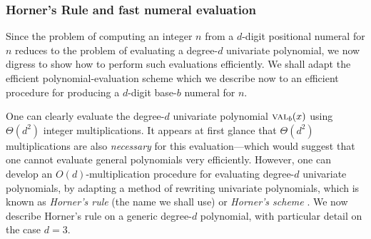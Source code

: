 \subsubsection{Horner's Rule and fast numeral evaluation}
\label{sec:Horner-fast-evaluation}

Since the problem of computing an integer $n$ from a $d$-digit positional numeral for $n$ reduces to the problem of evaluating a degree-$d$ univariate polynomial, we now digress to show how to perform such evaluations efficiently.  We shall adapt the efficient polynomial-evaluation scheme which we describe now to an efficient procedure for producing a $d$-digit base-$b$ numeral for $n$.

\medskip

 
 

One can clearly evaluate the degree-$d$ univariate polynomial $\mbox{\sc val}_{b}(x)$ using $\Theta(d^2)$ integer multiplications.  It appears at first glance that $\Theta(d^2)$ multiplications are also {\em necessary} for this evaluation---which would suggest that one cannot evaluate general polynomials very efficiently.  However, one can develop an $O(d)$-multiplication procedure for evaluating degree-$d$ univariate polynomials, by adapting a method of rewriting univariate polynomials, which is known as {\it Horner's rule} (the name we shall use) or {\it Horner's scheme} \cite{Horner}.  We now describe Horner's rule on a generic degree-$d$ polynomial, with particular detail on the case $d=3$.

\bigskip

\noindent {}

\bigskip


